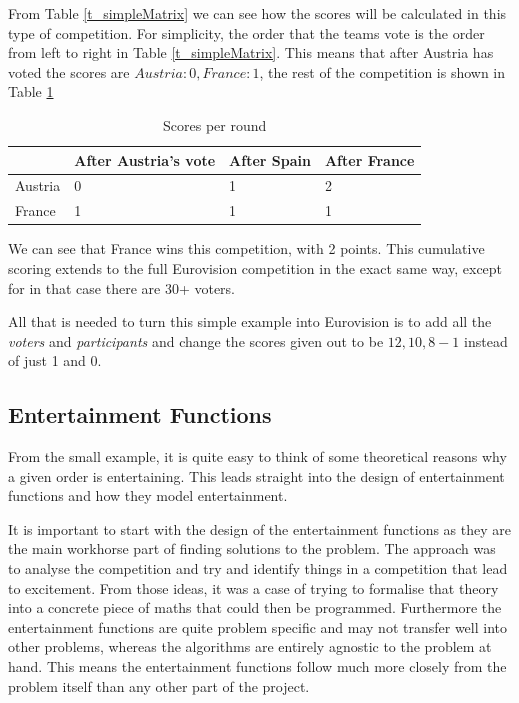 \documentclass[12pt]{report}
\begin{document}
From Table \ref{t_simpleMatrix} we can see how the scores will be calculated in this type of competition. For simplicity, the order that the teams vote is the order from left to right in Table \ref{t_simpleMatrix}. This means that after Austria has voted the scores are $Austria: 0, France: 1$, the rest of the competition is shown in Table \ref{t_simpleScores}

\begin{table}[H]
\centering
\caption{Scores per round}
\label{t_simpleScores}
\begin{tabular}{@{}|l|l|l|l|@{}}
\toprule
        & After Austria's vote & After Spain & After France \\ \midrule
Austria & 0       & 1     & 2      \\ \midrule
France  & 1       & 1     & 1      \\ \bottomrule
\end{tabular}
\end{table}

We can see that France wins this competition, with 2 points. This cumulative scoring extends to the full Eurovision competition in the exact same way, except for in that case there are 30+ voters.

All that is needed to turn this simple example into Eurovision is to add all the \textit{voters} and \textit{participants} and change the scores given out to be $12, 10, 8-1$ instead of just 1 and 0.

\subsection{Entertainment Functions}\label{EntertainmentFunction}
From the small example, it is quite easy to think of some theoretical reasons why a given order is entertaining. This leads straight into the design of entertainment functions and how they model entertainment. 

It is important to start with the design of the entertainment functions as they are the main workhorse part of finding solutions to the problem. The approach was to analyse the competition and try and identify things in a competition that lead to excitement. From those ideas, it was a case of trying to formalise that theory into a concrete piece of maths that could then be programmed. Furthermore the entertainment functions are quite problem specific and may not transfer well into other problems, whereas the algorithms are entirely agnostic to the problem at hand. This means the entertainment functions follow much more closely from the problem itself than any other part of the project.
\end{document}
